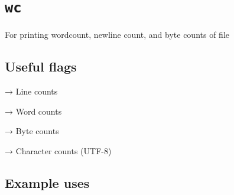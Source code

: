     
    
    

    
    \section{\texorpdfstring{\texttt{wc}}{wc}}\label{wc}

For printing wordcount, newline count, and byte counts of file

    \subsection{Useful flags}\label{useful-flags}

\begin{Shaded}
\begin{Highlighting}[]
 
\end{Highlighting}
\end{Shaded}

→ Line counts

\begin{Shaded}
\begin{Highlighting}[]
 
\end{Highlighting}
\end{Shaded}

→ Word counts

\begin{Shaded}
\begin{Highlighting}[]
 
\end{Highlighting}
\end{Shaded}

→ Byte counts

\begin{Shaded}
\begin{Highlighting}[]
 
\end{Highlighting}
\end{Shaded}

→ Character counts (UTF-8)

    \subsection{Example uses}\label{example-uses}

\begin{Shaded}
\begin{Highlighting}[]
 
\end{Highlighting}
\end{Shaded}

